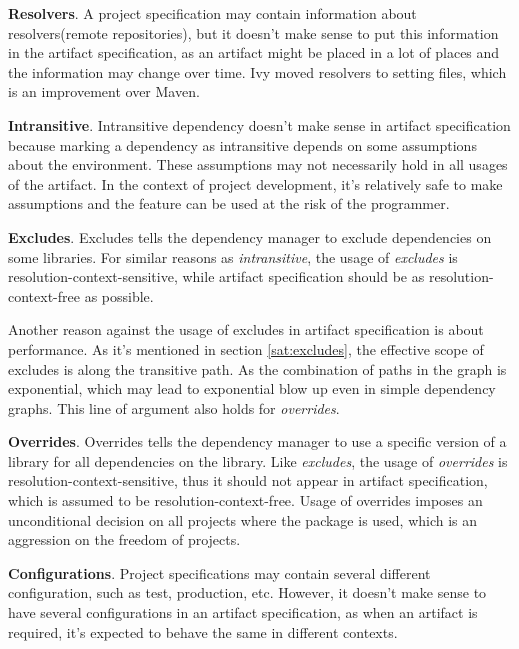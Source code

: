 \textbf{Resolvers}. A project specification may contain information about resolvers(remote repositories), but it doesn't make sense to put this information in the artifact specification, as an artifact might be placed in a lot of places and the information may change over time. Ivy moved resolvers to setting files, which is an improvement over Maven.


\textbf{Intransitive}. Intransitive dependency doesn't make sense in artifact specification because marking a dependency as intransitive depends on some assumptions about the environment. These assumptions may not necessarily hold in all usages of the artifact. In the context of project development, it's relatively safe to make assumptions and the feature can be used at the risk of the programmer.

\textbf{Excludes}. Excludes tells the dependency manager to exclude dependencies on some libraries. For similar reasons as \emph{intransitive}, the usage of \emph{excludes} is resolution-context-sensitive, while artifact specification should be as resolution-context-free as possible.

Another reason against the usage of excludes in artifact specification is about performance. As it's mentioned in section \ref{sat:excludes}, the effective scope of excludes is along the transitive path. As the combination of paths in the graph is exponential, which may lead to exponential blow up even in simple dependency graphs. This line of argument also holds for \emph{overrides}.

\textbf{Overrides}. Overrides tells the dependency manager to use a specific version of a library for all dependencies on the library. Like \emph{excludes}, the usage of \emph{overrides} is resolution-context-sensitive, thus it should not appear in artifact specification, which is assumed to be resolution-context-free. Usage of overrides imposes an unconditional decision on all projects where the package is used, which is an aggression on the freedom of projects.

\textbf{Configurations}. Project specifications may contain several different configuration, such as test, production, etc. However, it doesn't make sense to have several configurations in an artifact specification, as when an artifact is required, it's expected to behave the same in different contexts.

